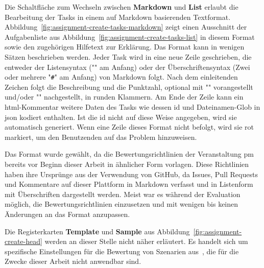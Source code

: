 Die Schaltfläche zum Wechseln zwischen \textbf{Markdown} und \textbf{List} erlaubt die Bearbeitung der Tasks in einem auf Markdown basierenden Textformat.
Abbildung~\ref{fig:assignment-create-tasks-markdown} zeigt einen Ausschnitt der Aufgabenliste aus Abbildung~\ref{fig:assignment-create-tasks-list} in diesem Format sowie den zugehörigen Hilfetext zur Erklärung.
Das Format kann in wenigen Sätzen beschrieben werden.
Jeder Task wird in eine neue Zeile geschrieben, die entweder der Listensyntax ("\code{-}" am Anfang) oder der Überschriftensyntax (Zwei oder mehrere "\texttt{\#}" am Anfang) von Markdown folgt.
Nach dem einleitenden Zeichen folgt die Beschreibung und die Punktzahl, optional mit "" vorangestellt und/oder "" nachgestellt, in runden Klammern.
Am Ende der Zeile kann ein \ac{html}-Kommentar weitere Daten des Tasks wie dessen \ac{id} und Dateinamen-Glob in \ac{json} kodiert enthalten.
Ist die \ac{id} nicht auf diese Weise angegeben, wird sie automatisch generiert.
Wenn eine Zeile dieses Format nicht befolgt, wird sie rot markiert, um den Benutzenden auf das Problem hinzuweisen.

Das Format wurde gewählt, da die Bewertungsrichtlinien der Veranstaltung \ac{pm} bereits vor Beginn dieser Arbeit in ähnlicher Form vorlagen.
Diese Richtlinien haben ihre Ursprünge aus der Verwendung von GitHub, da Issues, Pull Requests und Kommentare auf dieser Plattform in Markdown verfasst und in Listenform mit Überschriften dargestellt werden.
Meist war es während der Evaluation möglich, die Bewertungsrichtlinien einzusetzen und mit wenigen bis keinen Änderungen an das Format anzupassen.

Die Registerkarten \textbf{Template} und \textbf{Sample} aus Abbildung~\ref{fig:assignment-create-head} werden an dieser Stelle nicht näher erläutert.
Es handelt sich um spezifische Einstellungen für die Bewertung von Szenarien aus~\cite{bachelor-thesis}, die für die Zwecke dieser Arbeit nicht anwendbar sind.

